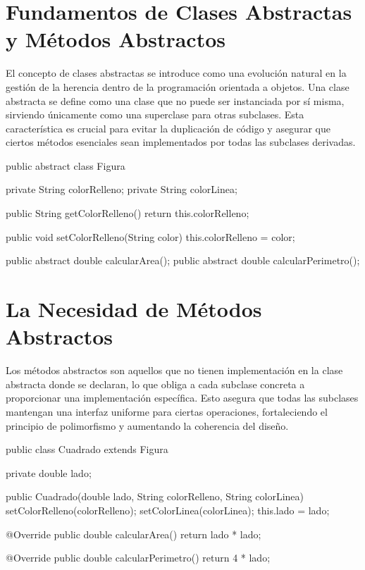 \documentclass[a4paper]{report}
\begin{document}
\section{Fundamentos de Clases Abstractas y Métodos Abstractos}
El concepto de clases abstractas se introduce como una evolución natural en la gestión de la herencia dentro de la programación orientada a objetos. Una clase abstracta se define como una clase que no puede ser instanciada por sí misma, sirviendo únicamente como una superclase para otras subclases. Esta característica es crucial para evitar la duplicación de código y asegurar que ciertos métodos esenciales sean implementados por todas las subclases derivadas.

\begin{roundedlst}
public abstract class Figura {
    private String colorRelleno;
    private String colorLinea;

    public String getColorRelleno() {
        return this.colorRelleno;
    }

    public void setColorRelleno(String color) {
        this.colorRelleno = color;
    }

    public abstract double calcularArea();
    public abstract double calcularPerimetro();
}
\end{roundedlst}

\section{La Necesidad de Métodos Abstractos}
Los métodos abstractos son aquellos que no tienen implementación en la clase abstracta donde se declaran, lo que obliga a cada subclase concreta a proporcionar una implementación específica. Esto asegura que todas las subclases mantengan una interfaz uniforme para ciertas operaciones, fortaleciendo el principio de polimorfismo y aumentando la coherencia del diseño.
\begin{roundedlst}
    public class Cuadrado extends Figura {
        private double lado;

        public Cuadrado(double lado, String colorRelleno, 
                        String colorLinea) {
            setColorRelleno(colorRelleno);
            setColorLinea(colorLinea);
            this.lado = lado;
        }

        @Override
        public double calcularArea() {
            return lado * lado;
        }

        @Override
        public double calcularPerimetro() {
            return 4 * lado;
        }
    }
\end{roundedlst}
\end{document}
